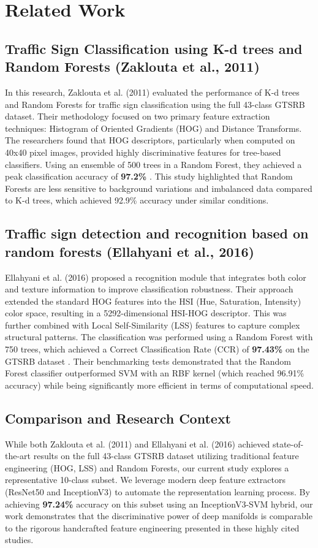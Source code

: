 \chapter{Related Work}

\section{Traffic Sign Classification using K-d trees and Random Forests (Zaklouta et al., 2011)}
In this research, Zaklouta et al. (2011) evaluated the performance of K-d trees and Random Forests for traffic sign classification using the full 43-class GTSRB dataset. Their methodology focused on two primary feature extraction techniques: Histogram of Oriented Gradients (HOG) and Distance Transforms. The researchers found that HOG descriptors, particularly when computed on 40x40 pixel images, provided highly discriminative features for tree-based classifiers. Using an ensemble of 500 trees in a Random Forest, they achieved a peak classification accuracy of \textbf{97.2\%} \cite{zaklouta2011}. This study highlighted that Random Forests are less sensitive to background variations and imbalanced data compared to K-d trees, which achieved 92.9\% accuracy under similar conditions.

\section{Traffic sign detection and recognition based on random forests (Ellahyani et al., 2016)}
Ellahyani et al. (2016) proposed a recognition module that integrates both color and texture information to improve classification robustness. Their approach extended the standard HOG features into the HSI (Hue, Saturation, Intensity) color space, resulting in a 5292-dimensional HSI-HOG descriptor. This was further combined with Local Self-Similarity (LSS) features to capture complex structural patterns. The classification was performed using a Random Forest with 750 trees, which achieved a Correct Classification Rate (CCR) of \textbf{97.43\%} on the GTSRB dataset \cite{ellahyani2016}. Their benchmarking tests demonstrated that the Random Forest classifier outperformed SVM with an RBF kernel (which reached 96.91\% accuracy) while being significantly more efficient in terms of computational speed.

\section{Comparison and Research Context}
While both Zaklouta et al. (2011) and Ellahyani et al. (2016) achieved state-of-the-art results on the full 43-class GTSRB dataset utilizing traditional feature engineering (HOG, LSS) and Random Forests, our current study explores a representative 10-class subset. We leverage modern deep feature extractors (ResNet50 and InceptionV3) to automate the representation learning process. By achieving \textbf{97.24\%} accuracy on this subset using an InceptionV3-SVM hybrid, our work demonstrates that the discriminative power of deep manifolds is comparable to the rigorous handcrafted feature engineering presented in these highly cited studies.
